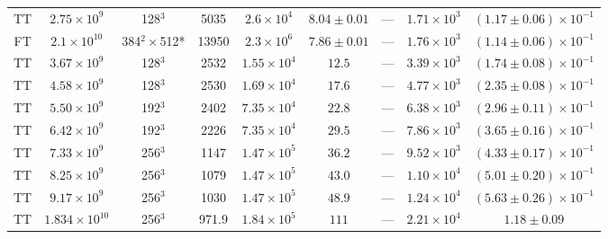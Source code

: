 \documentclass[aps, pre, onecolumn, nofootinbib, notitlepage, groupedaddress, amsfonts, amssymb, amsmath, longbibliography, superscriptaddress]{revtex4-1}
\begin{document}
\begin{table}[ht]
\begin{center}
{\begin{tabular}{c c c c c c c c c}
TT	&	$2.75 \times 10^9$		&	128$^3$				&	5035		&	$2.6 \times 10^4$	&	$8.04 \pm 0.01$	&	---		&	$1.71 \times 10^3$  & $(1.17 \pm 0.06) \times 10^{-1}$ \\
FT	&	$2.1 \times 10^{10}$	&	384$^2\times$512*	&	13950		&	$2.3 \times 10^6$	&	$7.86 \pm 0.01$	&	---		&	$1.76 \times 10^3$  & $(1.14 \pm 0.06) \times 10^{-1}$ \\
TT	&	$3.67 \times 10^9$		&	128$^3$				&	2532		&	$1.55 \times 10^4$	&	$12.5$			&	---		&	$3.39 \times 10^3$  & $(1.74 \pm 0.08) \times 10^{-1}$ \\
TT	&	$4.58 \times 10^9$		&	128$^3$				&	2530		&	$1.69 \times 10^4$	&	$17.6$			&	---		&	$4.77 \times 10^3$  & $(2.35 \pm 0.08) \times 10^{-1}$ \\
TT	&	$5.50 \times 10^9$		&	192$^3$				&	2402		&	$7.35 \times 10^4$	&	$22.8$			&	---		&	$6.38 \times 10^3$  & $(2.96 \pm 0.11) \times 10^{-1}$ \\
TT	&	$6.42 \times 10^9$		&	192$^3$				&	2226		&	$7.35 \times 10^4$	&	$29.5$			&	---		&	$7.86 \times 10^3$  & $(3.65 \pm 0.16) \times 10^{-1}$ \\
TT	&	$7.33 \times 10^9$		&	256$^3$				&	1147		&	$1.47 \times 10^5$	&	$36.2$			&	---		&	$9.52 \times 10^3$  & $(4.33 \pm 0.17) \times 10^{-1}$ \\
TT	&	$8.25 \times 10^9$		&	256$^3$				&	1079		&	$1.47 \times 10^5$	&	$43.0$			&	---		&	$1.10 \times 10^4$  & $(5.01 \pm 0.20) \times 10^{-1}$ \\
TT	&	$9.17 \times 10^9$		&	256$^3$				&	1030		&	$1.47 \times 10^5$	&	$48.9$			&	---		&	$1.24 \times 10^4$  & $(5.63 \pm 0.26) \times 10^{-1}$ \\
TT	&	$1.834 \times 10^{10}$	&	256$^3$				&	971.9		&	$1.84 \times 10^5$	&	$111$			&	---		&	$2.21 \times 10^4$  & $1.18 \pm 0.09$ \\
\hline																	
\end{tabular}
}
\end{center}
\end{table}
\end{document}
